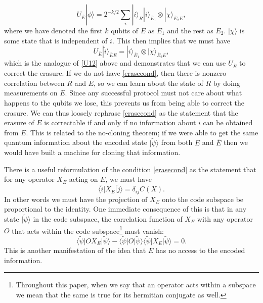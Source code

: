 \documentclass[11pt]{article}
\newcommand{\be}{\begin{equation}}
\newcommand{\ee}{\end{equation}}
\newcommand{\lan}{\langle}
\newcommand{\ran}{\rangle}
\newcommand{\wt}{\widetilde}
\begin{document}
\be
U_{\overline{E}}|\phi\ran=2^{-k/2}\sum_i |i\ran_R|i\ran_{\overline{E}_1}\otimes |\chi\ran_{\overline{E}_2 E},
\ee
where we have denoted the first $k$ qubits of $\overline{E}$ as $\overline{E}_1$ and the rest as $\overline{E}_2$.  $|\chi\ran$ is some state that is independent of $i$.  This then implies that we must have
\be
U_{\overline{E}}|\wt{i}\ran_{\overline{E}E}=|i\ran_{\overline{E}_1}\otimes |\chi\ran_{\overline{E}_2 E},
\ee
which is the analogue of \eqref{U12} above and demonstrates that we can use $U_{\overline{E}}$ to correct the erasure.  If we do not have \eqref{erasecond}, then there is nonzero correlation between $R$ and $E$, so we can learn about the state of $R$ by doing measurements on $E$.  Since any successful protocol must not care about what happens to the qubits we lose, this prevents us from being able to correct the erasure.  We can thus loosely rephrase \eqref{erasecond} as the statement that the erasure of $E$ is correctable if and only if no information about $i$ can be obtained from $E$.  This is related to the no-cloning theorem; if we were able to get the same quantum information about the encoded state $|\wt{\psi}\ran$ from both $E$ and $\overline{E}$ then we would have built a machine for cloning that information.

There is a useful reformulation of the condition \eqref{erasecond} as the statement that for any operator $X_E$ acting on $E$, we must have \cite{grassl1997codes}
\be\label{erasecond2}
\lan \wt{i}|X_E|\wt{j}\ran=\delta_{ij} C(X).
\ee
In other words we must have the projection of $X_E$ onto the code subspace be proportional to the identity.  One immediate consequence of this is that in any state $|\wt{\psi}\ran$ in the code subspace,  the correlation function of $X_E$ with any operator $O$ that acts within the code subspace\footnote{Throughout this paper, when we say that an operator acts within a subspace we mean that the same is true for its hermitian conjugate as well.} must vanish:
\be\label{codecorr}
\lan \wt{\psi}|O X_E|\wt{\psi}\ran-\lan \wt{\psi}|O|\wt{\psi}\ran\lan \wt{\psi}|X_E|\wt{\psi}\ran=0.
\ee
This is another manifestation of the idea that $E$ has no access to the encoded information.  
\end{document}
